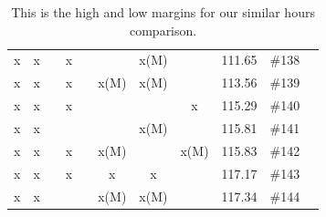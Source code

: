 \begin{table}[H]
{\begin{tabular}{c c c c c c c c c c c}
 x    & x    &      & x    &      &      & x(M) &      & 111.65 & \#138 \\
 x    & x    &      & x    &      & x(M) & x(M) &      & 113.56 & \#139 \\
 x    & x    &      & x    &      &      &      & x    & 115.29 & \#140 \\
 x    & x    &      &      &      &      & x(M) &      & 115.81 & \#141 \\
 x    & x    &      & x    &      & x(M) &      & x(M) & 115.83 & \#142 \\
 x    & x    &      & x    &      & x    & x    &      & 117.17 & \#143 \\
 x    & x    &      &      &      & x(M) & x(M) &      & 117.34 & \#144 \\
\hline %
\end{tabular}
}
\caption{This is the high and low margins for our similar hours comparison.} %
\label{table:similarHoursLimits} %
\end{table}

